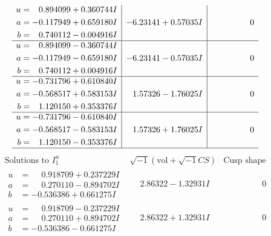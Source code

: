 \documentclass[1p]{elsarticle_modified}
\theoremstyle{definition}
\newcommand{\I}{\sqrt{-1}}
\begin{document}
$$\begin{array}{c|c|c}
\begin{aligned}
u &= \phantom{-}0.894099 + 0.360744 I \\
a &= -0.117949 + 0.659180 I \\
b &= \phantom{-}0.740112 - 0.004916 I\end{aligned}
 & -6.23141 + 0.57035 I & \phantom{-0.000000 } 0 \\ \hline\begin{aligned}
u &= \phantom{-}0.894099 - 0.360744 I \\
a &= -0.117949 - 0.659180 I \\
b &= \phantom{-}0.740112 + 0.004916 I\end{aligned}
 & -6.23141 - 0.57035 I & \phantom{-0.000000 } 0 \\ \hline\begin{aligned}
u &= -0.731796 + 0.610840 I \\
a &= -0.568517 + 0.583153 I \\
b &= \phantom{-}1.120150 + 0.353376 I\end{aligned}
 & \phantom{-}1.57326 - 1.76025 I & \phantom{-0.000000 } 0 \\ \hline\begin{aligned}
u &= -0.731796 - 0.610840 I \\
a &= -0.568517 - 0.583153 I \\
b &= \phantom{-}1.120150 - 0.353376 I\end{aligned}
 & \phantom{-}1.57326 + 1.76025 I & \phantom{-0.000000 } 0\\
 \hline 
 \end{array}$$\newpage$$\begin{array}{c|c|c}  
\text{Solutions to }I^u_{1}& \I (\text{vol} + \sqrt{-1}CS) & \text{Cusp shape}\\
 \hline 
\begin{aligned}
u &= \phantom{-}0.918709 + 0.237229 I \\
a &= \phantom{-}0.270110 - 0.894702 I \\
b &= -0.536386 + 0.661275 I\end{aligned}
 & \phantom{-}2.86322 - 1.32931 I & \phantom{-0.000000 } 0 \\ \hline\begin{aligned}
u &= \phantom{-}0.918709 - 0.237229 I \\
a &= \phantom{-}0.270110 + 0.894702 I \\
b &= -0.536386 - 0.661275 I\end{aligned}
 & \phantom{-}2.86322 + 1.32931 I & \phantom{-0.000000 } 0 \\ \hline\begin{aligned}

\end{aligned}
\end{array}$$
\end{document}
